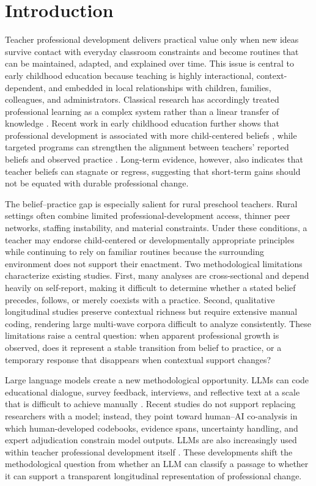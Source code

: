 \documentclass[pdflatex,sn-mathphys-num]{sn-jnl}%
\theoremstyle{thmstyleone}%
\theoremstyle{thmstyletwo}%
\theoremstyle{thmstylethree}%
\begin{document}
\section{Introduction}

Teacher professional development delivers practical value only when new ideas survive contact with everyday classroom constraints and become routines that can be maintained, adapted, and explained over time. This issue is central to early childhood education because teaching is highly interactional, context-dependent, and embedded in local relationships with children, families, colleagues, and administrators. Classical research has accordingly treated professional learning as a complex system rather than a linear transfer of knowledge \cite{avalos2011pd,opfer2011learning,timperley2007bes}. Recent work in early childhood education further shows that professional development is associated with more child-centered beliefs \cite{yang2024pdbeliefs}, while targeted programs can strengthen the alignment between teachers' reported beliefs and observed practice \cite{chen2025alignment}. Long-term evidence, however, also indicates that teacher beliefs can stagnate or regress, suggesting that short-term gains should not be equated with durable professional change.

The belief--practice gap is especially salient for rural preschool teachers. Rural settings often combine limited professional-development access, thinner peer networks, staffing instability, and material constraints. Under these conditions, a teacher may endorse child-centered or developmentally appropriate principles while continuing to rely on familiar routines because the surrounding environment does not support their enactment. Two methodological limitations characterize existing studies. First, many analyses are cross-sectional and depend heavily on self-report, making it difficult to determine whether a stated belief precedes, follows, or merely coexists with a practice. Second, qualitative longitudinal studies preserve contextual richness but require extensive manual coding, rendering large multi-wave corpora difficult to analyze consistently. These limitations raise a central question: when apparent professional growth is observed, does it represent a stable transition from belief to practice, or a temporary response that disappears when contextual support changes?

Large language models create a new methodological opportunity. LLMs can code educational dialogue, survey feedback, interviews, and reflective text at a scale that is difficult to achieve manually \cite{long2024dialogue,parker2025survey,chen2024qual,shin2025cocoding,liu2025voices}. Recent studies do not support replacing researchers with a model; instead, they point toward human--AI co-analysis in which human-developed codebooks, evidence spans, uncertainty handling, and expert adjudication constrain model outputs. LLMs are also increasingly used within teacher professional development itself \cite{wang2025pdllm,wang2025bertllama,li2026sdpd,tan2026agency,zhou2025longitudinal}. These developments shift the methodological question from whether an LLM can classify a passage to whether it can support a transparent longitudinal representation of professional change.
\end{document}
